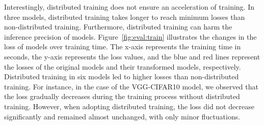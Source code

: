 Interestingly, distributed training does not ensure an acceleration of
training.
In three models, distributed training takes longer to reach
minimum losses than non-distributed training.
Furthermore, distributed training can harm the inference precision of models.
Figure~\ref{fig:eval:train} illustrates the changes in the loss of models over
training time. 
The x-axis represents the training time in seconds, the y-axis represents the
loss values, and the blue and red lines represent the losses of the
original models and their transformed models, respectively.
Distributed training in six models led to higher losses than
non-distributed training.
For instance, in the case of the VGG-CIFAR10 model, we observed that the loss
gradually decreases during the training process without distributed training.
However, when adopting distributed training, the loss did not decrease
significantly and remained almost unchanged, with only minor fluctuations.



